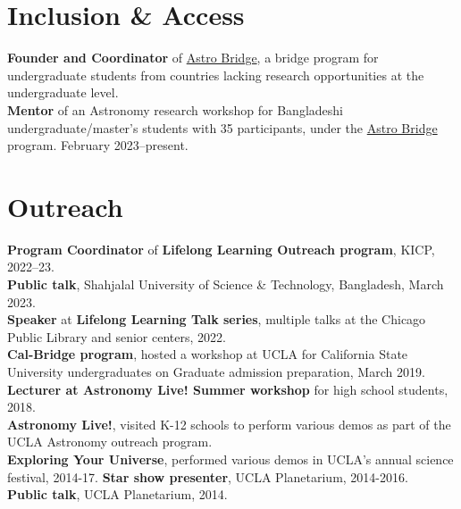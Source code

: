 \documentclass[margin, line]{res}
\begin{document}
\begin{resume}
%
%
%


\section{\sc Inclusion \& Access}
{\bf Founder and Coordinator} of \href{https://www.astrobridge.org/}{Astro Bridge}, a bridge program for undergraduate students from countries lacking research opportunities at the undergraduate level. \\
{\bf Mentor} of an Astronomy research workshop for Bangladeshi undergraduate/master's students with 35 participants, under the \href{https://www.astrobridge.org/projects/bdlensing}{Astro Bridge} program. February 2023--present. \\ 

\section{\sc Outreach}
{\bf Program Coordinator} of {\bf Lifelong Learning Outreach program}, KICP, 2022--23. \\
{\bf Public talk}, Shahjalal University of Science \& Technology, Bangladesh, March 2023. \\
{\bf Speaker} at {\bf Lifelong Learning Talk series}, multiple talks at the Chicago Public Library and senior centers, 2022. \\
{\bf Cal-Bridge program}, hosted a workshop at UCLA for California State University undergraduates on Graduate admission preparation, March 2019. \\
{\bf Lecturer at Astronomy Live! Summer workshop} for high school students, 2018. \\
{\bf Astronomy Live!}, visited K-12 schools to perform various demos as part of the UCLA Astronomy outreach program. \\
{\bf Exploring Your Universe}, performed various demos in UCLA's annual science festival, 2014-17.
{\bf Star show presenter}, UCLA Planetarium, 2014-2016. \\
{\bf Public talk}, UCLA Planetarium, 2014. \\



\end{resume}
\end{document}
